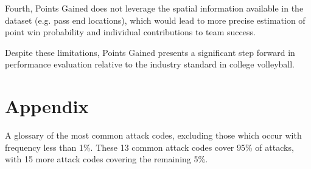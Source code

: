 \documentclass[USenglish]{article}
\theoremstyle{dgthm}
\theoremstyle{dgdef}
\begin{document}
Fourth, Points Gained does not leverage the spatial information available in the dataset (e.g. pass end locations), which would lead to more precise estimation of point win probability and individual contributions to team success.

Despite these limitations, Points Gained presents a significant step forward in performance evaluation relative to the industry standard in college volleyball.

\printbibliography

\newpage

\section{Appendix}

\begin{table}
  \color{blue}
  \centering
  
  \caption{
    \color{blue}
    A glossary of the most common attack codes, excluding those which occur with frequency less than 1\%. These 13 common attack codes cover 95\% of attacks, with 15 more attack codes covering the remaining 5\%.
  }
  \label{tab:attack-code}
\end{table}
\end{document}
